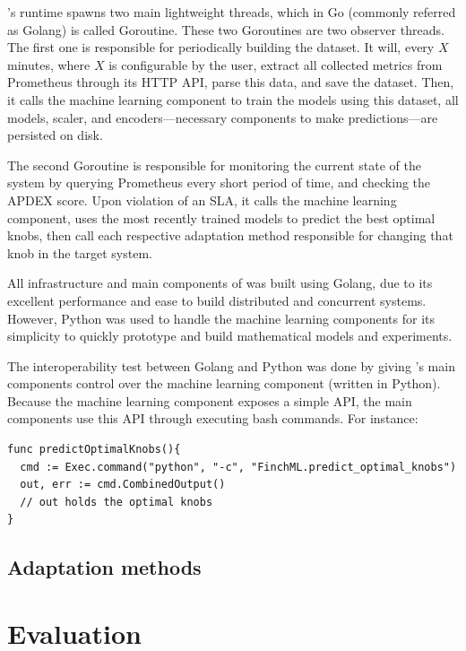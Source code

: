 \projectname{}'s runtime spawns two main lightweight threads, which in Go (commonly referred as Golang) is called Goroutine. These two Goroutines are two observer threads. The first one is responsible for periodically building the dataset. It will, every $X$ minutes, where $X$ is configurable by the user, extract all collected metrics from Prometheus through its HTTP API, parse this data, and save the dataset. Then, it calls the machine learning component to train the models using this dataset, all models, scaler, and encoders---necessary components to make predictions---are persisted on disk.

The second Goroutine is responsible for monitoring the current state of the system by querying Prometheus every short period of time, and checking the APDEX score. Upon violation of an SLA, it calls the machine learning component, uses the most recently trained models to predict the best optimal knobs, then call each respective adaptation method responsible for changing that knob in the target system.

All infrastructure and main components of \projectname{} was built using Golang, due to its excellent performance and ease to build distributed and concurrent systems. However, Python was used to handle the machine learning components for its simplicity to quickly prototype and build mathematical models and experiments.

The interoperability test between Golang and Python was done by giving \projectname{}'s main components control over the machine learning component (written in Python). Because the machine learning component exposes a simple API, the main components use this API through executing bash commands. For instance:

\begin{lstlisting}
func predictOptimalKnobs(){
  cmd := Exec.command("python", "-c", "FinchML.predict_optimal_knobs")
  out, err := cmd.CombinedOutput()
  // out holds the optimal knobs
}
\end{lstlisting}


\subsection{Adaptation methods}


\section{Evaluation}

